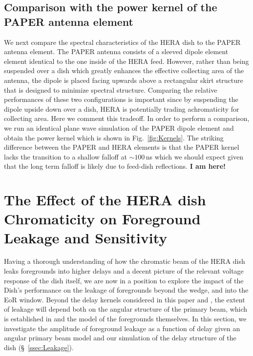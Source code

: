 \documentclass[twocolumn]{emulateapj}
\begin{document}
\subsection{Comparison with the power kernel of the PAPER antenna element}
We next compare the spectral characteristics of the HERA dish to the PAPER antenna element. The PAPER antenna consists of a sleeved dipole element element identical to the one inside of the HERA feed. However, rather than being suspended over a dish which greatly enhances the effective collecting area of the antenna, the dipole is placed facing upwards above a rectangular skirt structure that is designed to minimize spectral structure. Comparing the relative performances of these two configurations is important since by suspending the dipole upside down over a dish, HERA is potentially trading achromaticity for collecting area. Here we comment this tradeoff. In order to perform a comparison, we run an identical plane wave simulation of the PAPER dipole element and obtain the power kernel which is shown in Fig.~\ref{fig:Kernels}. The striking difference between the PAPER and HERA elements is that the PAPER kernel lacks the transition to a shallow falloff at $\sim 100$\,ns which we should expect given that the long term falloff is likely due to feed-dish reflections. {\bf I am here!}

\section{The Effect of the HERA dish Chromaticity on Foreground Leakage and Sensitivity}\label{sec:Sensitivity}
Having a thorough understanding of how the chromatic beam of the HERA dish leaks foregrounds into higher delays and a decent picture of the relevant voltage response of the dish itself, we are now in a position to explore the impact of the Dish's performance on the leakage of foregrounds beyond the wedge, and into the EoR window. Beyond the delay kernels considered in this paper and \citep{Patra:2015}, the extent of leakage will depend both on the angular structure of the primary beam, which is established in \citep{Neben:2015b} and the model of the foregrounds themselves. In this section, we investigate the amplitude of foreground leakage as a function of delay given an angular primary beam model and our simulation of the delay structure of the dish (\S~\ref{ssec:Leakage}). 
\end{document}
